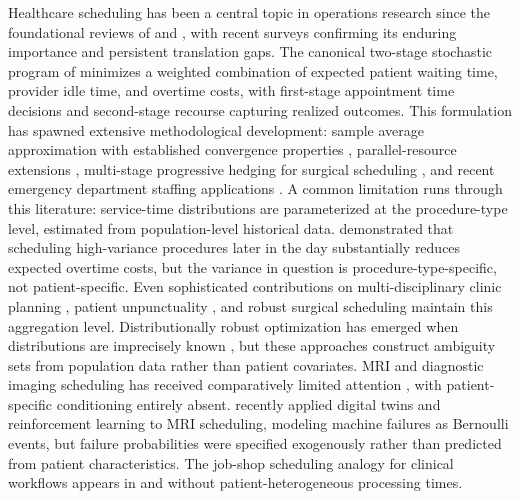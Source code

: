 \documentclass[11pt,a4paper]{article}
\begin{document}
Healthcare scheduling has been a central topic in operations research since the foundational reviews of \citet{cayirli2003outpatient} and \citet{gupta2008appointment}, with recent surveys \citep{ahmadi2017outpatient, youn2022planning, belien2025fifty} confirming its enduring importance and persistent translation gaps. The canonical two-stage stochastic program of \citet{denton2003sequential} minimizes a weighted combination of expected patient waiting time, provider idle time, and overtime costs, with first-stage appointment time decisions and second-stage recourse capturing realized outcomes. This formulation has spawned extensive methodological development: sample average approximation with established convergence properties \citep{kleywegt2002sample, mancilla2012sample}, parallel-resource extensions \citep{denton2010optimal}, multi-stage progressive hedging for surgical scheduling \citep{gul2015progressive}, and recent emergency department staffing applications \citep{marchesi2025stochastic}. A common limitation runs through this literature: service-time distributions are parameterized at the procedure-type level, estimated from population-level historical data. \citet{denton2007optimization} demonstrated that scheduling high-variance procedures later in the day substantially reduces expected overtime costs, but the variance in question is procedure-type-specific, not patient-specific. Even sophisticated contributions on multi-disciplinary clinic planning \citep{leeftink2019stochastic}, patient unpunctuality \citep{jiang2019stochastic}, and robust surgical scheduling \citep{neyshabouri2017two} maintain this aggregation level. Distributionally robust optimization has emerged when distributions are imprecisely known \citep{jiang2017integer, shehadeh2021distributionally}, but these approaches construct ambiguity sets from population data rather than patient covariates. MRI and diagnostic imaging scheduling has received comparatively limited attention \citep{qiu2019mri, sun2021stochastic, bouguerra2023integrating}, with patient-specific conditioning entirely absent. \citet{silvaaravena2025mri} recently applied digital twins and reinforcement learning to MRI scheduling, modeling machine failures as Bernoulli events, but failure probabilities were specified exogenously rather than predicted from patient characteristics. The job-shop scheduling analogy for clinical workflows appears in \citet{burdett2018flexible} and \citet{pham2008surgical} without patient-heterogeneous processing times.
\end{document}
